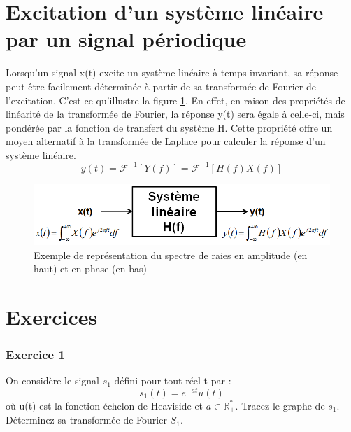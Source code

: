 	\section{Excitation d'un système linéaire par un signal périodique}
	Lorsqu'un signal x(t) excite un système linéaire à temps invariant, sa réponse peut être facilement déterminée à partir de sa transformée de Fourier de l'excitation. C'est ce qu'illustre la figure \ref{Fig:Excitation d'un système linéaire par un signal apériodique}. En effet, en raison des propriétés de linéarité de la transformée de Fourier, la réponse y(t) sera égale à celle-ci, mais pondérée par la fonction de transfert du système H. Cette propriété offre un moyen alternatif à la transformée de Laplace pour calculer la réponse d'un système linéaire.
	\begin{equation}\label{key}
	y(t)=\mathcal{F}^{-1}[Y(f)]=\mathcal{F}^{-1}[H(f)X(f)]
	\end{equation}
	
	\begin{figure}[h!]
		\centering
		\includegraphics[scale=0.6]{images/LTI_TF.png}
		\caption{Exemple de représentation du spectre de raies en amplitude (en haut) et en phase (en bas)}	
		\label{Fig:Excitation d'un système linéaire par un signal apériodique} 
	\end{figure}
	
	
	
	\section{Exercices}
	
	\subsubsection{Exercice 1}
	
	On considère le signal $s_1$ défini pour tout réel t par :
	\begin{equation*}
	s_1(t)=e^{-at}u(t)
	\end{equation*}
	où u(t) est la fonction échelon de Heaviside et $a \in \mathbb{R_{+}^{*}}$. Tracez le graphe de $s_1$. Déterminez sa transformée de Fourier $S_1$.\\
	
